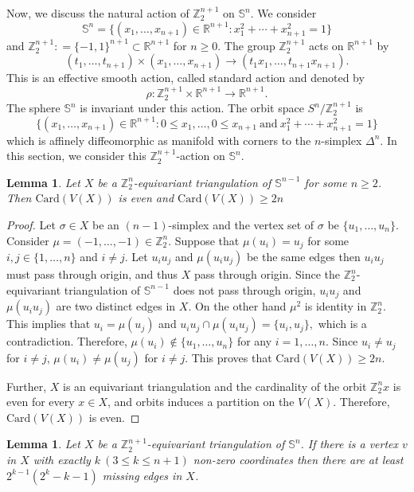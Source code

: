 \documentclass[11pt]{amsart}
\numberwithin{equation}{section}
\newtheorem{lemma}[theorem]{Lemma}
\theoremstyle{definition}
\newcommand{\Sp}{\mathbb{S}}
\def \bb{\mathbb}
\def \RR{{\bb{R}}}
\def \ZZ{{\bb{Z}}}
\begin{document}
Now, we discuss the natural action of $\ZZ_2^{n+1}$ on $\Sp^{n}$. We consider $$\Sp^{n} = \{(x_1, \ldots, x_{n+1}) \in \RR^{n+1} : x_1^2 + \cdots + x_{n+1}^2 =1\}$$ and
$\ZZ^{n+1}_2: =\{-1, 1\}^{n+1} \subset \RR^{n+1}$ for $n \geq 0$. The group $\ZZ^{n+1}_2$ acts
on $\RR^{n+1}$ by
\begin{equation}
 (t_1, \ldots, t_{n+1}) \times (x_1, \ldots, x_{n+1}) \to (t_1x_1, \ldots, t_{n+1}x_{n+1}).
\end{equation}
This is an effective smooth action, called standard action and denoted
by $$\rho \colon \ZZ_2^{n+1} \times \RR^{n+1} \to \RR^{n+1}.$$ The sphere $\Sp^{n}$ is invariant under this action. The orbit space $S^{n}/ \ZZ_2^{n+1}$ is $$\{(x_1, \ldots, x_{n+1}) \in \RR^{n+1} : 0 \leq x_1, \ldots,
0 \leq x_{n+1}~ \mbox{and} ~ x_1^2 + \cdots + x_{n+1}^2 =1\}$$ which is affinely diffeomorphic as manifold with corners to the $n$-simplex $\Delta^{n}$. In this section, we consider this
$\ZZ_2^{n+1}$-action on $\Sp^{n}$.

\begin{lemma}\label{lem3}
Let $X$ be a $\ZZ^{n}_2$-equivariant triangulation of $\Sp^{n-1}$ for some $n\geq 2$. Then $\mathrm{Card}(V(X))$ is even and $\mathrm{Card}( V(X)) \geq 2n$
\end{lemma}
\begin{proof}
Let $\sigma \in X$ be an $(n-1)$-simplex and  the vertex set of $\sigma$ be $\{u_1, \ldots, u_n\}$. Consider $\mu=(-1, \ldots, -1) \in \ZZ_2^n$.
Suppose that $\mu(u_i) = u_j$ for some $i, j \in \{1, \ldots, n\}$ and $i\neq j$. Let $u_iu_j$ and $\mu(u_iu_j)$ be the same edges then $u_iu_j$ must pass through origin, and thus $X$ pass through origin.
Since the $\ZZ_2^n$-equivariant triangulation of $\Sp^{n-1}$ does not pass through origin, $u_i u_j$ and $\mu(u_iu_j)$
are two distinct edges in $X$. On the other hand  $\mu^2$ is identity in $\ZZ_2^n$. This implies that $u_i= \mu(u_j)$ and
$u_iu_j \cap \mu(u_iu_j) = \{u_i, u_j\},$ which is a contradiction.
Therefore, $\mu(u_i) \notin \{u_1, \ldots, u_n\}$ for any $i=1, \ldots, n$. Since $u_i \neq u_j$ for $i \neq j$,
$\mu(u_i) \neq \mu(u_j)$ for $i \neq j$. This proves that $\mathrm{Card} (V(X)) \geq 2n$.

Further,  $X$ is an equivariant  triangulation and the cardinality of the orbit $\ZZ_2^n x$ is even for every $x\in X$, and orbits induces a partition on the $V(X)$. Therefore, $\mathrm{Card}(V(X))$ is even.  
\end{proof}
\begin{lemma}\label{missingedges}
Let $X$ be a $\ZZ_2^{n+1}$-equivariant triangulation of $\Sp^n$. If there is a vertex $v$ in $X$ with exactly $k ~(3\leq k\leq n+1)$ non-zero coordinates then there are at least $2^{k-1}(2^k-k-1)$ missing edges in $X$.
    
\end{lemma}
\end{document}
